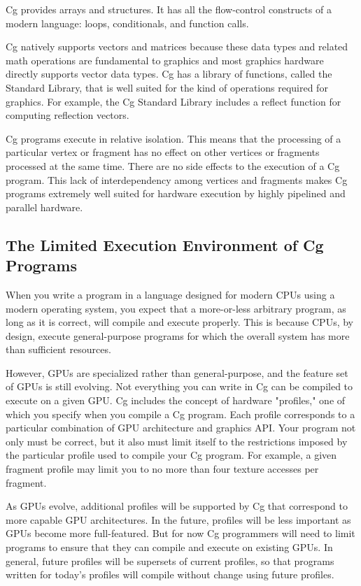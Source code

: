 \documentclass{book}
\begin{document}
Cg provides arrays and structures. It has all the flow-control constructs of a modern language: loops, conditionals, and function calls.

Cg natively supports vectors and matrices because these data types and related math operations are fundamental to graphics and most graphics hardware directly supports vector data types. Cg has a library of functions, called the Standard Library, that is well suited for the kind of operations required for graphics. For example, the Cg Standard Library includes a reflect function for computing reflection vectors.

Cg programs execute in relative isolation. This means that the processing of a particular vertex or fragment has no effect on other vertices or fragments processed at the same time. There are no side effects to the execution of a Cg program. This lack of interdependency among vertices and fragments makes Cg programs extremely well suited for hardware execution by highly pipelined and parallel hardware.

\subsection{The Limited Execution Environment of Cg Programs}

When you write a program in a language designed for modern CPUs using a modern operating system, you expect that a more-or-less arbitrary program, as long as it is correct, will compile and execute properly. This is because CPUs, by design, execute general-purpose programs for which the overall system has more than sufficient resources.

However, GPUs are specialized rather than general-purpose, and the feature set of GPUs is still evolving. Not everything you can write in Cg can be compiled to execute on a given GPU. Cg includes the concept of hardware "profiles," one of which you specify when you compile a Cg program. Each profile corresponds to a particular combination of GPU architecture and graphics API. Your program not only must be correct, but it also must limit itself to the restrictions imposed by the particular profile used to compile your Cg program. For example, a given fragment profile may limit you to no more than four texture accesses per fragment.

As GPUs evolve, additional profiles will be supported by Cg that correspond to more capable GPU architectures. In the future, profiles will be less important as GPUs become more full-featured. But for now Cg programmers will need to limit programs to ensure that they can compile and execute on existing GPUs. In general, future profiles will be supersets of current profiles, so that programs written for today's profiles will compile without change using future profiles.
\end{document}
